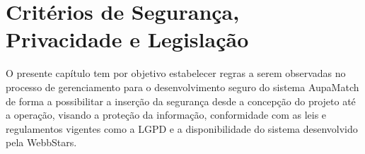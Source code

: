 \section{Critérios de Segurança, Privacidade e Legislação}

O presente capítulo tem por objetivo estabelecer regras a serem observadas no processo de gerenciamento para o desenvolvimento seguro do sistema AupaMatch de forma a possibilitar a inserção da segurança desde a concepção do projeto até a operação, visando a proteção da informação, conformidade com as leis e regulamentos vigentes como a \gls{LGPD} e a disponibilidade do sistema desenvolvido pela WebbStars.  




